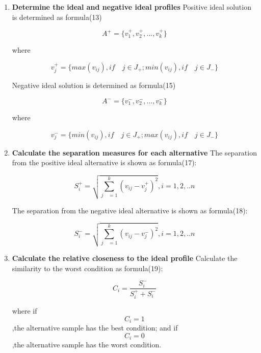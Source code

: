 \documentclass{mcmthesis}
\begin{document}
\begin{enumerate}
          \item \textbf{Determine the ideal and negative ideal profiles}
          Positive ideal solution is determined as formula(13)
            \begin{table}[!hbpt]
               \centering
               $$ { A }^{ + }=\{ { v }_{ 1 }^{ + },{ v }_{ 2 }^{ + },...,{ v }_{ k }^{ + }\}  $$
             \end{table}
        where
            \begin{table}[!hbpt]
               \centering
               $$ { v }_{ j }^{ + }=\{ max({ v }_{ ij }),if\quad j\in J_+;min({ v }_{ ij }),if\quad j\in J_-\}  $$
             \end{table}
        Negative ideal solution is determined as formula(15)
            \begin{table}[!hbpt]
               \centering
               $$ { A }^{ - }=\{ { v }_{ 1 }^{ - },{ v }_{ 2 }^{ - },...,{ v }_{ k }^{ - }\}  $$
             \end{table}
        where
            \begin{table}[!hbpt]
               \centering
               $$ { v }_{ j }^{ - }=\{ min({ v }_{ ij }),if\quad j\in J_+;max({ v }_{ ij }),if\quad j\in J_-\}   $$
             \end{table}
             
          \item \textbf{Calculate the separation measures for each alternative}
         The separation from the positive ideal alternative is shown as formula(17):
            \begin{table}[!hbpt]
               \centering
               $$ { S }_{ i }^{ + }=\sqrt { \sum _{ j\quad =1 }^{ k }{ { ({ v }_{ ij }-{ v }_{ j }^{ + }) }^{ 2 } }  } ,i = 1,2,..n $$
             \end{table}
          The separation from the negative ideal alternative is shown as formula(18):
            \begin{table}[!hbpt]
               \centering
               $$ { S }_{ i }^{ - }=\sqrt { \sum _{ j\quad =1 }^{ k }{ { ({ v }_{ ij }-{ v }_{ j }^{ - }) }^{ 2 } }  } ,i = 1,2,..n $$
             \end{table}
          
          \item \textbf{Calculate the relative closeness to the ideal profile}
         Calculate the similarity to the worst condition as formula(19):
            \begin{table}[!hbpt]
               \centering
               $$ C_{ { i } }=\frac { { S }_{ i }^{ - } }{ { S }_{ i }^{ + }+{ S }_{ i }^{ - } }  $$
             \end{table}
         where
         if $$ C_{i}=1 $$,the alternative sample has the best condition; and
         if $$ C_{i}=0 $$,the alternative sample has the worst condition.


\end{enumerate}
\end{document}
